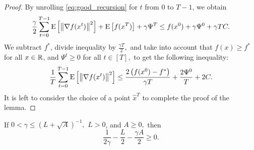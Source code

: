 \documentclass{article}
\begin{document}
\begin{proof}
  By unrolling \eqref{eq:good_recursion} for $t$ from $0$ to $T - 1$, we obtain
  \begin{align*}
      \frac{\gamma}{2}\sum_{t = 0}^{T - 1}{\rm E}\left[\left\| \nabla f(x^t) \right\|^2\right] + {\rm E}\left[f(x^{T})\right] + \gamma \Psi^{T} \leq f(x^0) + \gamma \Psi^{0} + \gamma T C.
  \end{align*}
  We subtract $f^*$, divide inequality by $\frac{\gamma T}{2},$ and take into account that $f(x) \geq f^*$ for all $x \in \mathbb{R}$, and $\Psi^{t} \geq 0$ for all $t \in [T],$ to get the following inequality:
  \begin{align*}
      \frac{1}{T}\sum_{t = 0}^{T - 1}{\rm E}\left[\left\| \nabla f(x^t) \right\|^2\right] \leq \frac{2 \left(f(x^0) - f^*\right)}{\gamma T} + \frac{2\Psi^{0}}{T} + 2 C.
  \end{align*}
  It is left to consider the choice of a point $\widehat{x}^T$ to complete the proof of the lemma.
\end{proof}

\begin{lemma}
  \label{lemma:gamma}
  If $0 < \gamma \leq (L + \sqrt{A})^{-1},$ $L > 0$, and $A \geq 0,$ then $$\frac{1}{2\gamma} - \frac{L}{2} - \frac{\gamma A}{2} \geq 0.$$
\end{lemma}
\end{document}
